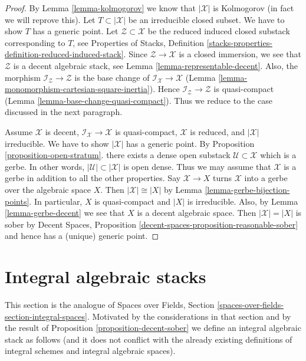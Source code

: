 \begin{proof}
By Lemma \ref{lemma-kolmogorov} we know that $|\mathcal{X}|$ is Kolmogorov
(in fact we will reprove this).
Let $T \subset |\mathcal{X}|$ be an irreducible closed subset.
We have to show $T$ has a generic point.
Let $\mathcal{Z} \subset \mathcal{X}$ be the reduced induced
closed substack corresponding to $T$, see Properties of Stacks, Definition
\ref{stacks-properties-definition-reduced-induced-stack}.
Since $\mathcal{Z} \to \mathcal{X}$ is a closed immersion,
we see that $\mathcal{Z}$ is a decent algebraic stack, see
Lemma \ref{lemma-representable-decent}.
Also, the morphism $\mathcal{I}_\mathcal{Z} \to \mathcal{Z}$
is the base change of $\mathcal{I}_\mathcal{X} \to \mathcal{X}$
(Lemma \ref{lemma-monomorphism-cartesian-square-inertia}).
Hence $\mathcal{I}_\mathcal{Z} \to \mathcal{Z}$ is quasi-compact
(Lemma \ref{lemma-base-change-quasi-compact}).
Thus we reduce to the case discussed in the next paragraph.

\medskip\noindent
Assume $\mathcal{X}$ is decent,
$\mathcal{I}_\mathcal{X} \to \mathcal{X}$ is quasi-compact,
$\mathcal{X}$ is reduced, and $|\mathcal{X}|$ irreducible.
We have to show $|\mathcal{X}|$ has a generic point.
By Proposition \ref{proposition-open-stratum}.
there exists a dense open substack $\mathcal{U} \subset \mathcal{X}$
which is a gerbe. In other words, $|\mathcal{U}| \subset |\mathcal{X}|$
is open dense. Thus we may assume that $\mathcal{X}$ is a gerbe
in addition to all the other properties.
Say $\mathcal{X} \to X$ turns $\mathcal{X}$ into a gerbe over the
algebraic space $X$. Then $|\mathcal{X}| \cong |X|$ by
Lemma \ref{lemma-gerbe-bijection-points}.
In particular, $X$ is quasi-compact and $|X|$ is irreducible.
Also, by Lemma \ref{lemma-gerbe-decent}
we see that $X$ is a decent algebraic space.
Then $|\mathcal{X}| = |X|$ is sober by
Decent Spaces, Proposition \ref{decent-spaces-proposition-reasonable-sober}
and hence has a (unique) generic point.
\end{proof}






\section{Integral algebraic stacks}
\label{section-integral-stacks}

\noindent
This section is the analogue of Spaces over Fields, Section
\ref{spaces-over-fields-section-integral-spaces}.
Motivated by the considerations in that section and by the result
of Proposition \ref{proposition-decent-sober} we define an
integral algebraic stack as follows (and it does not conflict
with the already existing definitions of integral schemes and
integral algebraic spaces).

